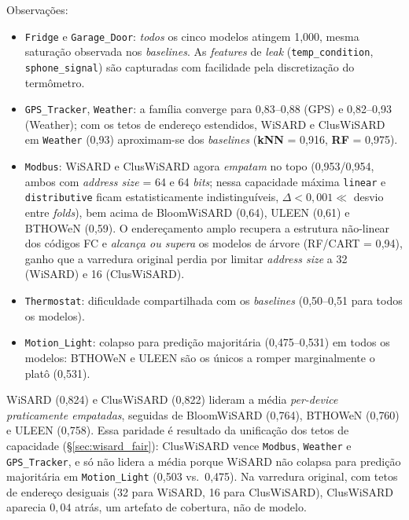 Observações:
\begin{itemize}[leftmargin=*,itemsep=0pt]
  \item \texttt{Fridge} e \texttt{Garage\_Door}: \emph{todos} os
        cinco modelos atingem 1{,}000, mesma saturação observada
        nos \emph{baselines}. As \emph{features} de \emph{leak}
        (\texttt{temp\_condition}, \texttt{sphone\_signal}) são
        capturadas com facilidade pela discretização do termômetro.
  \item \texttt{GPS\_Tracker}, \texttt{Weather}: a família converge
        para 0{,}83--0{,}88 (GPS) e 0{,}82--0{,}93 (Weather); com os
        tetos de endereço estendidos, WiSARD e ClusWiSARD em
        \texttt{Weather} (0{,}93) aproximam-se dos \emph{baselines}
        (\textbf{kNN} = 0{,}916, \textbf{RF} = 0{,}975).
  \item \texttt{Modbus}: WiSARD e ClusWiSARD agora \emph{empatam} no
        topo (0{,}953/0{,}954, ambos com \emph{address size} = 64 e 64
        \emph{bits}; nessa capacidade máxima \texttt{linear} e
        \texttt{distributive} ficam estatisticamente indistinguíveis,
        $\Delta < 0{,}001 \ll$ desvio entre \emph{folds}), bem acima
        de BloomWiSARD (0{,}64), ULEEN (0{,}61) e BTHOWeN (0{,}59). O
        endereçamento amplo recupera a estrutura não-linear dos códigos
        FC e \emph{alcança ou supera} os modelos de árvore
        (RF/CART = 0{,}94), ganho que a varredura original perdia por
        limitar \emph{address size} a 32 (WiSARD) e 16 (ClusWiSARD).
  \item \texttt{Thermostat}: dificuldade compartilhada com os
        \emph{baselines} (0{,}50--0{,}51 para todos os modelos).
  \item \texttt{Motion\_Light}: colapso para predição majoritária
        (0{,}475--0{,}531) em todos os modelos: BTHOWeN e ULEEN são
        os únicos a romper marginalmente o platô (0{,}531).
\end{itemize}

WiSARD (0{,}824) e ClusWiSARD (0{,}822) lideram a média
\emph{per-device} \emph{praticamente empatadas}, seguidas de
BloomWiSARD (0{,}764), BTHOWeN (0{,}760) e ULEEN (0{,}758). Essa
paridade é resultado da unificação dos tetos de capacidade
(\S{}\ref{sec:wisard_fair}): ClusWiSARD vence \texttt{Modbus},
\texttt{Weather} e \texttt{GPS\_Tracker}, e só não lidera a média
porque WiSARD não colapsa para predição majoritária em
\texttt{Motion\_Light} (0{,}503 vs.\ 0{,}475). Na varredura original,
com tetos de endereço desiguais (32 para WiSARD, 16 para ClusWiSARD),
ClusWiSARD aparecia $0{,}04$ atrás, um artefato de cobertura, não de
modelo.

